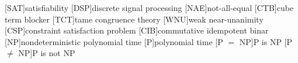 \usepackage{xspace}

[SAT]{satisfiability}
[DSP]{discrete signal processing}
[NAE]{not-all-equal}
[CTB]{cube term blocker}
[TCT]{tame congruence theory}
[WNU]{weak near-unanimity}
[CSP]{constraint satisfaction problem}
[CIB]{commutative idempotent binar}
[NP]{nondeterministic polynomial time}
[P]{polynomial time}
[P $ = $ NP]{P is NP}
[P $ \neq $ NP]{P is not NP}
\newcommand{\bool}{\ensuremath{\mathtt{Bool}}}
\newcommand{\true}{\ensuremath{\mathtt{true}}}
\newcommand{\false}{\ensuremath{\mathtt{false}}}
\newcommand{\CSP}{\ensuremath{\operatorname{CSP}}}
\newcommand{\slt}{\ensuremath{\mathbf S_2}}
\newcommand{\wnu}{\acs{wnu}\xspace}
\newcommand{\tct}{\acs{tct}\xspace}
\newcommand{\ctb}{\acs{ctb}\xspace}
\newcommand{\csp}{\acs{CSP}\xspace}
\newcommand{\dsp}{\acs{dsp}\xspace}
\newcommand{\sat}{\acs{sat}\xspace}
\newcommand{\nae}{\acs{nae}\xspace}
\newcommand{\csps}{\acsp{CSP}\xspace}
\newcommand{\cib}{\acs{cib}\xspace}
\newcommand{\cibs}{\acsp{cib}\xspace}
\newcommand{\PeqNP}{\acs{PeqNP}\xspace}
\newcommand{\PneqNP}{\acs{PneqNP}\xspace}
\newcommand{\NPcomplete}{\acs{NP}-complete\xspace}
\newcommand{\NP}{\acs{NP}\xspace}
\renewcommand{\P}{\acs{P}\xspace}
\usepackage{scalefnt}
\usepackage{tikz}
\usepackage{color}
\usepackage[margin=1in]{geometry}
\usetikzlibrary{calc}
\newcommand{\mfA}{\ensuremath{\mathfrak{A}}}
\newcommand{\mfX}{\ensuremath{\mathfrak{X}}}
\newcommand{\lb}{\ensuremath{\llbracket}}
\newcommand{\rb}{\ensuremath{\rrbracket}}
\newcommand{\id}{\ensuremath{\operatorname{id}}}
\newcommand{\fin}{\ensuremath{\operatorname{fin}}}
\newcommand{\Eq}{\ensuremath{\operatorname{Eq}}}
\newcommand{\Rel}{\ensuremath{\operatorname{Rel}}}
\newcommand{\Proj}{\ensuremath{\operatorname{Proj}}}
\newcommand{\arity}{\ensuremath{\operatorname{arity}}}
\newcommand{\Op}{\ensuremath{\operatorname{Op}}}
\newcommand{\alg}[1]{\ensuremath{\mathbf{#1}}}
\newcommand{\Sub}{\ensuremath{\operatorname{Sub}}}
\newcommand{\Con}{\ensuremath{\operatorname{Con}}}
\newcommand{\Clo}{\ensuremath{\operatorname{Clo}}}
\newcommand{\Pol}{\ensuremath{\operatorname{Pol}}}
\newcommand{\Poly}{\ensuremath{\operatorname{Poly}}}
\newcommand{\V}{\ensuremath{\operatorname{V}}}

\usepackage{bm}
\newcommand{\N}{\ensuremath{\mathbb{N}}}
\newcommand{\SDwedge}{\ensuremath{\mbox{SD}_\wedge}}

